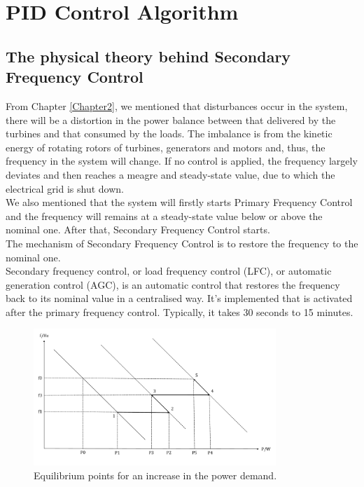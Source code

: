 \documentclass{report}
\begin{document}
\chapter{PID Control Algorithm}
\label{Chapter3}
\section{The physical theory behind Secondary Frequency Control} %
From Chapter \textcolor{red}{\ref{Chapter2}}, we mentioned that disturbances occur in the system, there will be a distortion in the power balance between that delivered by the turbines and that consumed by the loads. The imbalance is from the kinetic energy of rotating rotors of turbines, generators and motors and, thus, the frequency in the system will change. If no control is applied, the frequency largely deviates and then reaches a meagre and steady-state value, due to which the electrical grid is shut down. \\

We also mentioned that the system will firstly starts Primary Frequency Control and the frequency will remains at a steady-state value below or above the nominal one. After that, Secondary Frequency Control starts.\\

The mechanism of Secondary Frequency Control is to restore the frequency to the nominal one.\\

Secondary frequency control, or load frequency control (LFC), or automatic generation control (AGC), is an automatic control that restores the frequency back to its nominal value in a centralised way. It's implemented that is activated after the primary frequency control. Typically, it takes 30 seconds to 15 minutes.\\

\begin{figure}[htbp]
\centering
\includegraphics[width = 0.816\textwidth]{figure/3_1_Equilibrium.pdf}
\caption{Equilibrium points for an increase in the power demand.}
\label{3_1_Equilibrium}
\end{figure}
\end{document}
